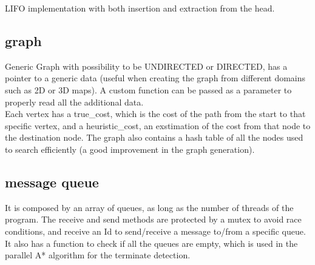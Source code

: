 LIFO implementation with both insertion and extraction from the head.

\subsection{graph}

Generic Graph with possibility to be UNDIRECTED or DIRECTED, has a pointer to a generic data (useful when creating the graph from different domains such as 2D or 3D maps). A custom function can be passed as a parameter to properly read all the additional data. \\
Each vertex has a true\_cost, which is the cost of the path from the start to that specific vertex, and a heuristic\_cost, an exstimation of the cost from that node to the destination node.
The graph also contains a hash table of all the nodes used to search efficiently (a good improvement in the graph generation).

\subsection{message queue}
\label{message_queue}

It is composed by an array of queues, as long as the number of threads of the program.
The receive and send methods are protected by a mutex to avoid race conditions, and receive an Id to send/receive a message to/from a specific queue. 
It also has a function to check if all the queues are empty, which is used in the parallel A* algorithm for the terminate detection.
